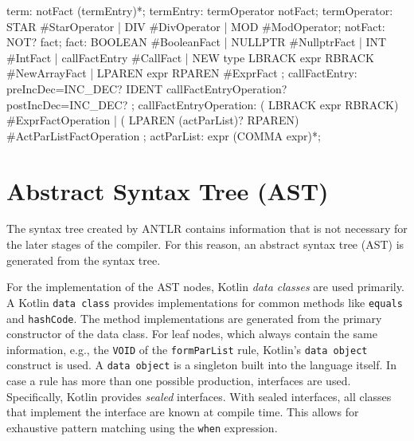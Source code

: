 \begin{AntlrCode}[float,numbers=none,caption=Expression rules for terms and factors of the MiniC++ ANTLR grammar., label=lst:ANTLRMiniCppExprTermFact]
term:             notFact (termEntry)*;
termEntry:        termOperator notFact;
termOperator:     STAR                         #StarOperator
                | DIV                          #DivOperator
                | MOD                          #ModOperator;
notFact:          NOT? fact;
fact:             BOOLEAN                      #BooleanFact
                | NULLPTR                      #NullptrFact
                | INT                          #IntFact
                | callFactEntry                #CallFact
                | NEW type LBRACK expr RBRACK  #NewArrayFact
                | LPAREN expr RPAREN           #ExprFact
                ;
callFactEntry:    preIncDec=INC_DEC?
                  IDENT
                  callFactEntryOperation?
                  postIncDec=INC_DEC?
                  ;
callFactEntryOperation:
      ( LBRACK expr    RBRACK)                #ExprFactOperation
    | ( LPAREN (actParList)?    RPAREN)       #ActParListFactOperation
    ;
actParList:       expr (COMMA expr)*;
\end{AntlrCode}

\section{Abstract Syntax Tree (AST)}

The syntax tree created by ANTLR contains information that is not necessary for the later stages of the compiler. For this reason, an abstract syntax tree (AST) is generated from the syntax tree. 

For the implementation of the AST nodes, Kotlin \textit{data classes} are used primarily. A Kotlin \texttt{data class} provides implementations for common methods like \texttt{equals} and \verb|hashCode|. The method implementations are generated from the primary constructor of the data class. For leaf nodes, which always contain the same information, e.g., the \verb|VOID| of the \verb|formParList| rule, Kotlin's \verb|data object| construct is used. A \verb|data object| is a singleton built into the language itself. In case a rule has more than one possible production, interfaces are used. Specifically, Kotlin provides \textit{sealed} interfaces. With sealed interfaces, all classes that implement the interface are known at compile time. This allows for exhaustive pattern matching using the \verb|when| expression. 

